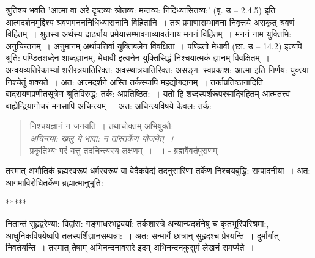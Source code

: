 {श्रुतिश्च भवति 'आत्मा वा अरे दृष्टव्यः श्रोतव्य: मन्तव्य: निदिध्यासितव्य:' (बृ. उ – 2.4.5) इति आत्मदर्शनमुद्दिश्य श्रवणमनननिधिध्यासनानि विहितानि~। तत्र प्रमाणासम्भावना निवृत्तये असकृत् श्रवणं विहितम्~। श्रुतस्य अर्थस्य दार्ढ्याय प्रमेयासम्भावनाव्यावर्तनाय मननं विहितम्~। मननं नाम युक्तिभि: अनुचिन्तनम्~। अनुमानम् अर्थापत्तिर्वा युक्तिबलेन विवक्षिता~। पण्डितो मेधावी (छा. उ – 14.2) इत्यपि श्रुति: पण्डितशब्देन शाब्दज्ञानम्, मेधावी इत्यनेन युक्तिसिद्धं निश्चयात्मकं ज्ञानम् विवक्षितम्~। अन्वयव्यतिरेकाभ्यां शरीरत्रयातिरिक्त: अवस्थात्रयातिरिक्त: असङ्ग: स्वप्रकाश: आत्मा इति निर्णय: युक्त्या निश्चेतुं शक्यते~। अत: आत्मदर्शने अस्ति तर्कस्यापि महद्योगदानम्~। तर्काप्रतिष्ठानादिति बादरायणप्रणीतसूत्रेण श्रुतिविरुद्ध: तर्क: अप्रतिष्ठित:~। यतो हि शब्दस्पर्शरूपरसादिरहितम् आत्मतत्त्वं बाह्येन्द्रियागोचरं मनसापि अचिन्त्यम्~। अत: अचिन्त्यविषये केवल: तर्क:
\begin{verse}
निश्चयज्ञानं न जनयति~। तथाचोक्तम् अभियुक्तै: -\\
\textit{अचिन्त्या: खलु ये भावा: न तांस्तर्केण योजयेत्~। }\\
प्रकृतिभ्यः परं यत्तु तदचिन्त्यस्य लक्षणम्~। ~। - ब्रह्मवैवर्तपुराणम्
\end{verse}
तस्मात् अभौतिकं ब्रह्मस्वरूपं धर्मस्वरूपं वा वेदैकवेद्यं तदनुसारिणा तर्केण निश्चयबुद्धि: सम्पादनीया~। अत: आगमाविरोधितर्केण ब्रह्मात्मानुभूति: 

\centerline{*****}

नितान्तं सुहृद्वरेण्या: विद्वांस: गङ्गाधरभट्टवर्या: तर्कशास्त्रे अन्यान्यदर्शनेषु च कृतभूरिपरिश्रमा:, आधुनिकविषयेष्वपि तलस्पर्शिज्ञानसम्पन्ना:~। अत: सन्मार्गे छात्रान् सुहृदश्च प्रेरयन्ति~। दुर्मार्गात् निवर्तयन्ति~। तस्मात् तेषाम् अभिनन्दनावसरे इदम् अभिनन्दनकुसुमं लेखनं समर्प्यते~। 

\articleend
}
